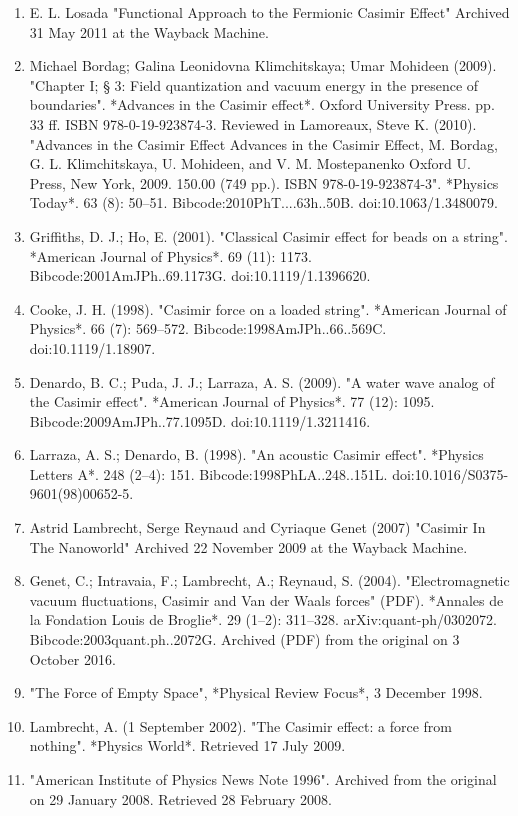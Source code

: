 \begin{enumerate}
\item E. L. Losada "Functional Approach to the Fermionic Casimir Effect" Archived 31 May 2011 at the Wayback Machine.
\item Michael Bordag; Galina Leonidovna Klimchitskaya; Umar Mohideen (2009). "Chapter I; § 3: Field quantization and vacuum energy in the presence of boundaries". *Advances in the Casimir effect*. Oxford University Press. pp. 33 ff. ISBN 978-0-19-923874-3. Reviewed in Lamoreaux, Steve K. (2010). "Advances in the Casimir Effect Advances in the Casimir Effect, M. Bordag, G. L. Klimchitskaya, U. Mohideen, and V. M. Mostepanenko Oxford U. Press, New York, 2009. 150.00 (749 pp.). ISBN 978-0-19-923874-3". *Physics Today*. 63 (8): 50–51. Bibcode:2010PhT....63h..50B. doi:10.1063/1.3480079.
\item Griffiths, D. J.; Ho, E. (2001). "Classical Casimir effect for beads on a string". *American Journal of Physics*. 69 (11): 1173. Bibcode:2001AmJPh..69.1173G. doi:10.1119/1.1396620.
\item Cooke, J. H. (1998). "Casimir force on a loaded string". *American Journal of Physics*. 66 (7): 569–572. Bibcode:1998AmJPh..66..569C. doi:10.1119/1.18907.
\item Denardo, B. C.; Puda, J. J.; Larraza, A. S. (2009). "A water wave analog of the Casimir effect". *American Journal of Physics*. 77 (12): 1095. Bibcode:2009AmJPh..77.1095D. doi:10.1119/1.3211416.
\item Larraza, A. S.; Denardo, B. (1998). "An acoustic Casimir effect". *Physics Letters A*. 248 (2–4): 151. Bibcode:1998PhLA..248..151L. doi:10.1016/S0375-9601(98)00652-5.
\item Astrid Lambrecht, Serge Reynaud and Cyriaque Genet (2007) "Casimir In The Nanoworld" Archived 22 November 2009 at the Wayback Machine.
\item Genet, C.; Intravaia, F.; Lambrecht, A.; Reynaud, S. (2004). "Electromagnetic vacuum fluctuations, Casimir and Van der Waals forces" (PDF). *Annales de la Fondation Louis de Broglie*. 29 (1–2): 311–328. arXiv:quant-ph/0302072. Bibcode:2003quant.ph..2072G. Archived (PDF) from the original on 3 October 2016.
\item "The Force of Empty Space", *Physical Review Focus*, 3 December 1998.
\item Lambrecht, A. (1 September 2002). "The Casimir effect: a force from nothing". *Physics World*. Retrieved 17 July 2009.
\item "American Institute of Physics News Note 1996". Archived from the original on 29 January 2008. Retrieved 28 February 2008.

\end{enumerate}
